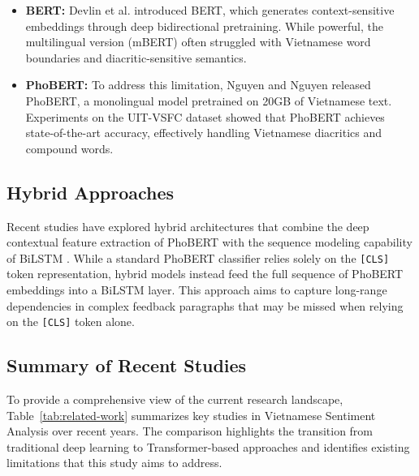 \documentclass[12pt]{report} %
\begin{document}
\begin{itemize}
    \item \textbf{BERT:} Devlin et al. \cite{devlin2018bert} introduced BERT, which generates context-sensitive embeddings through deep bidirectional pretraining. While powerful, the multilingual version (mBERT) often struggled with Vietnamese word boundaries and diacritic-sensitive semantics.

    \item \textbf{PhoBERT:} To address this limitation, Nguyen and Nguyen \cite{nguyen2020phobert} released PhoBERT, a monolingual model pretrained on 20GB of Vietnamese text. Experiments on the UIT-VSFC dataset \cite{nguyen2018uitvsfc} showed that PhoBERT achieves state-of-the-art accuracy, effectively handling Vietnamese diacritics and compound words.
\end{itemize}

\subsection{Hybrid Approaches}

Recent studies have explored hybrid architectures that combine the deep contextual feature extraction of PhoBERT with the sequence modeling capability of BiLSTM \cite{pham2020sentiment}. While a standard PhoBERT classifier relies solely on the \texttt{[CLS]} token representation, hybrid models instead feed the full sequence of PhoBERT embeddings into a BiLSTM layer. This approach aims to capture long-range dependencies in complex feedback paragraphs that may be missed when relying on the \texttt{[CLS]} token alone.

\subsection{Summary of Recent Studies}

To provide a comprehensive view of the current research landscape, Table~\ref{tab:related-work} summarizes key studies in Vietnamese Sentiment Analysis over recent years. The comparison highlights the transition from traditional deep learning to Transformer-based approaches and identifies existing limitations that this study aims to address.
\end{document}
